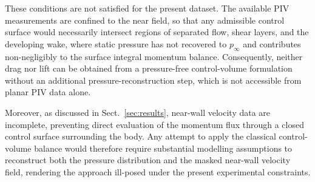 \documentclass[wes, manuscript]{copernicus}
\begin{document}
These conditions are not satisfied for the present dataset. The available PIV measurements are confined to the near field, so that any admissible control surface would necessarily intersect regions of separated flow, shear layers, and the developing wake, where static pressure has not recovered to $p_{\infty}$ and contributes non-negligibly to the surface integral momentum balance. Consequently, neither drag nor lift can be obtained from a pressure-free control-volume formulation without an additional pressure-reconstruction step, which is not accessible from planar PIV data alone.

Moreover, as discussed in Sect.~\ref{sec:results}, near-wall velocity data are incomplete, preventing direct evaluation of the momentum flux through a closed control surface surrounding the body. Any attempt to apply the classical control-volume balance would therefore require substantial modelling assumptions to reconstruct both the pressure distribution and the masked near-wall velocity field, rendering the approach ill-posed under the present experimental constraints. 
\end{document}
